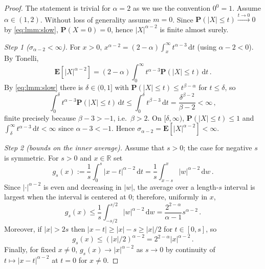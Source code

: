 \documentclass{article}
\newcommand{\R}{\mathbb{R}}
\newcommand{\lb}{\left(} %
\newcommand{\rb}{\right)} %
\newcommand{\br}[1]{\lb #1 \rb} %
\newcommand{\brOf}[1]{\!\br{#1}} %
\renewcommand{\Pr}{\mathbf{P}} %
\newcommand{\Prof}[1]{\Pr(#1)}
\newcommand{\E}{\mathbf{E}} %
\newcommand{\Eof}[1]{\E[#1]}
\newcommand{\eqcm}{\,,} %
\newcommand{\eqfs}{\,.}
\newcommand{\dl}{\mathrm{d}} %
\begin{document}
\begin{proof}
    The statement is trivial for $\alpha=2$ as we use the convention $0^0 = 1$. Assume $\alpha\in(1,2)$.
    Without loss of generality assume $m=0$. Since $\Prof{|X|\leq t} \xrightarrow{t\to0}0$ by \eqref{eq:lmm:slow}, $\Prof{X=0}=0$, hence $|X|^{\alpha-2}$ is finite almost surely. 
    
    \emph{Step 1 ($\sigma_{\alpha-2}<\infty$).}
    For $x>0$, $x^{\alpha-2}=(2-\alpha)\int_x^\infty t^{\alpha-3}\,\dl t$
    (using $\alpha-2<0$). By Tonelli,
    \begin{equation}
        \Eof{|X|^{\alpha-2}}
        =(2-\alpha)\int_0^\infty t^{\alpha-3}\Prof{|X|\leq t} \,\dl t
        \eqfs
    \end{equation}
    By \eqref{eq:lmm:slow} there is $\delta\in(0,1]$ with $\Prof{|X|\leq t}\leq t^{\beta-\alpha}$
    for $t\le\delta$, so
    \begin{equation}
        \int_0^{\delta}t^{\alpha-3}\Prof{|X|\leq t}\,\dl t
        \leq
        \int_0^{\delta}t^{\beta-3}\,\dl t
        =
        \frac{\delta^{\beta-2}}{\beta-2}
        <
        \infty
        \eqcm
    \end{equation}
    finite precisely because $\beta-3>-1$, i.e.\ $\beta>2$. On $[\delta,\infty)$,
    $\Prof{|X|\leq t}\le1$ and $\int_\delta^\infty t^{\alpha-3}\,\dl t<\infty$ since
    $\alpha-3<-1$. Hence $\sigma_{\alpha-2}=\Eof{|X|^{\alpha-2}}<\infty$.
    
    \emph{Step 2 (bounds on the inner average).}
    Assume that $s>0$; the case for negative $s$ is symmetric.
    For $s>0$ and $x\in\R$ set
    \begin{equation}
        g_s(x)
        :=
        \frac1{s}\int_{0}^s |x-t|^{\alpha-2}\,\dl t
        =
        \frac1{s}\int_{x-s}^{x} |w|^{\alpha-2}\,\dl w
        \eqfs
    \end{equation}
    Since $|\cdot|^{\alpha-2}$ is even and decreasing in $|w|$, the average over
    a length-$s$ interval is largest when the interval is centered at $0$;
    therefore, uniformly in $x$,
    \begin{equation}\label{eq:gs:unif}
        g_s(x)
        \le
        \frac1{s}\int_{-s/2}^{s/2} |w|^{\alpha-2}\,\dl w
        =
        \frac{2^{2-\alpha}}{\alpha-1} s^{\alpha-2}
        \eqfs
    \end{equation}
    Moreover, if $|x|>2s$ then $|x-t|\ge|x|-s\ge|x|/2$ for $t\in[0,s]$, so
    \begin{equation}\label{eq:gs:far}
        g_s(x)\le\brOf{|x|/2}^{\alpha-2}=2^{2-\alpha}|x|^{\alpha-2}
        \eqfs
    \end{equation}
    Finally, for fixed $x\neq0$, $g_s(x)\to|x|^{\alpha-2}$ as $s\to0$ by
    continuity of $t\mapsto|x-t|^{\alpha-2}$ at $t = 0$ for $x\neq0$.
    

\end{proof}
\end{document}
